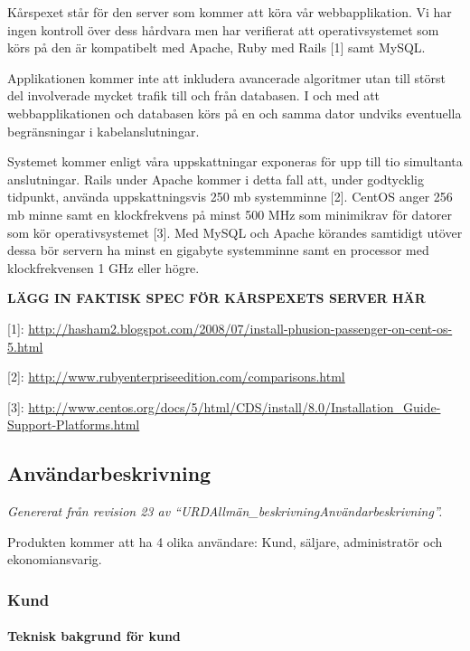 \documentclass[a4paper, twoside, 11pt, titlepage]{article}
\begin{document}
		Kårspexet står för den server som kommer att köra vår webbapplikation. Vi har ingen kontroll över dess hårdvara men har verifierat att operativsystemet som körs på den är kompatibelt med Apache, Ruby med Rails [1] samt MySQL. 

		Applikationen kommer inte att inkludera avancerade algoritmer utan till störst del involverade mycket trafik till och från databasen. I och med att webbapplikationen och databasen körs på en och samma dator undviks eventuella begränsningar i kabelanslutningar.

		Systemet kommer enligt våra uppskattningar exponeras för upp till tio simultanta anslutningar. Rails under Apache kommer i detta fall att, under godtycklig tidpunkt, använda uppskattningsvis 250 mb systemminne [2]. CentOS anger 256 mb minne samt en klockfrekvens på minst 500 MHz som minimikrav för datorer som kör operativsystemet [3]. Med MySQL och Apache körandes samtidigt utöver dessa bör servern ha minst en gigabyte systemminne samt en processor med klockfrekvensen 1 GHz eller högre.

		\textbf{LÄGG IN FAKTISK SPEC FÖR KÅRSPEXETS SERVER HÄR}

		[1]: \url{http://hasham2.blogspot.com/2008/07/install-phusion-passenger-on-cent-os-5.html}

		[2]: \url{http://www.rubyenterpriseedition.com/comparisons.html}

		[3]: \url{http://www.centos.org/docs/5/html/CDS/install/8.0/Installation\_Guide-Support-Platforms.html}

	\subsection{Användarbeskrivning}


	\emph{Genererat från revision 23 av ``URDAllmän\_beskrivningAnvändarbeskrivning''.}

	Produkten kommer att ha 4 olika användare: Kund, säljare, administratör och ekonomiansvarig.

	\subsubsection{Kund}



			\paragraph{Teknisk bakgrund för kund}
\end{document}
